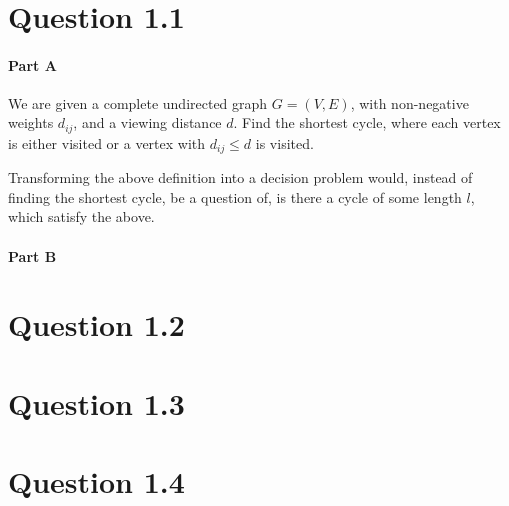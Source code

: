 \documentclass[10pt]{article}
\author{\authorName \\\texttt{\small{\authorEmail}}}
\title{\textsc{\titleName \\ \courseName}}
\begin{document}
\maketitle    

\section*{Question 1.1} %
\label{sec:question_1_1}
\paragraph{Part A} %
\label{par:part_a}
We are given a complete undirected graph $G = (V,E)$, with non-negative weights $d_{ij}$, and a viewing distance $d$.
Find the shortest cycle, where each vertex is either visited or a vertex with $d_{ij} \leq d$ is visited.

Transforming the above definition into a decision problem would, instead of finding the shortest cycle, be a question of, is there a cycle of some length $l$, which satisfy the above.



\paragraph{Part B} %
\label{par:part_b}


\section*{Question 1.2} %
\label{sec:question_1_2}

\section*{Question 1.3} %
\label{sec:question_1_3}


\section*{Question 1.4} %
\label{sec:question_1_4}
\end{document}
